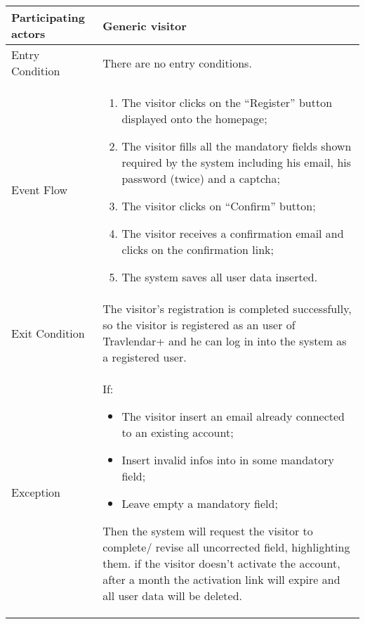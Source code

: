 \begin{table}[H]
	\begin{center}
		\begin{tabular}{ | p{} | p{} | }
		\hline
		Participating actors & Generic visitor\\
		\hline
		Entry Condition & There are no entry conditions.\\
		\hline
		Event Flow & 
			\begin{enumerate}
				\item The visitor clicks on the “Register” button displayed onto the homepage;
				\item The visitor fills all the mandatory fields shown required by the system including his email, his password (twice) and a captcha;
				\item The visitor clicks on “Confirm” button;
				\item The visitor receives a confirmation email and clicks on the confirmation link;
				\item The system saves all user data inserted.
			\end{enumerate} \\
		\hline
		Exit Condition & The visitor’s registration is completed successfully, so the visitor is registered as an user of Travlendar+ and he can log in into the system as a registered user. \\
		\hline
		Exception & If:
				\begin{itemize}
   					\item The visitor insert an email already connected to an existing account;
   					\item Insert invalid infos into in some mandatory field;
   					\item Leave empty a mandatory field;
   				\end{itemize}
   		Then the system will request the visitor to complete/ revise all uncorrected field, highlighting them.
if the visitor doesn’t activate the account, after a month the activation link will expire and all user data will be deleted.\\ 
		\hline
		\end{tabular}
	\end{center}
\end{table}